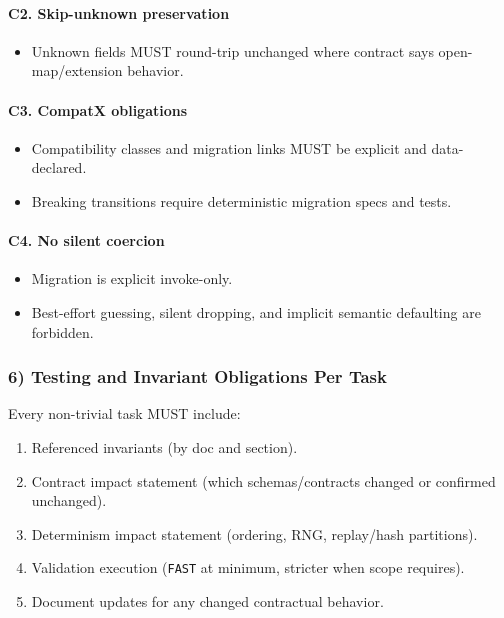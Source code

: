 \documentclass[9pt,a4paper,openany]{book}
\begin{document}
\paragraph{C2. Skip-unknown preservation}
\begin{itemize}
\item Unknown fields MUST round-\allowbreak{}trip unchanged where contract says open-\allowbreak{}map/\allowbreak{}extension behavior.\allowbreak{}
\end{itemize}

\paragraph{C3. CompatX obligations}
\begin{itemize}
\item Compatibility classes and migration links MUST be explicit and data-\allowbreak{}declared.\allowbreak{}
\item Breaking transitions require deterministic migration specs and tests.\allowbreak{}
\end{itemize}

\paragraph{C4. No silent coercion}
\begin{itemize}
\item Migration is explicit invoke-\allowbreak{}only.\allowbreak{}
\item Best-\allowbreak{}effort guessing, silent dropping, and implicit semantic defaulting are forbidden.\allowbreak{}
\end{itemize}

\subsubsection{6) Testing and Invariant Obligations Per Task}
Every non-\allowbreak{}trivial task MUST include:


\begin{enumerate}
\item Referenced invariants (by doc and section).\allowbreak{}
\item Contract impact statement (which schemas/\allowbreak{}contracts changed or confirmed unchanged).\allowbreak{}
\item Determinism impact statement (ordering, RNG, replay/\allowbreak{}hash partitions).\allowbreak{}
\item Validation execution (\texttt{FAST} at minimum, stricter when scope requires).\allowbreak{}
\item Document updates for any changed contractual behavior.\allowbreak{}
\end{enumerate}
\end{document}
